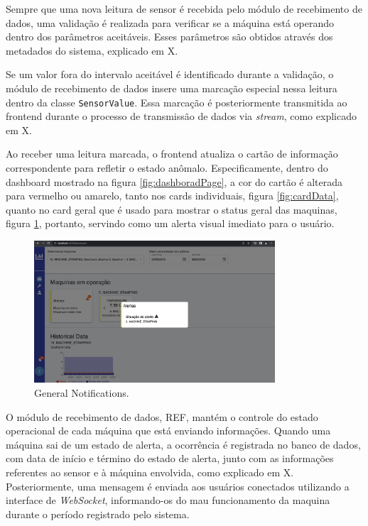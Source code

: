 Sempre que uma nova leitura de sensor é recebida pelo módulo de recebimento de dados, uma validação é realizada para verificar se a máquina está operando dentro dos parâmetros aceitáveis. Esses parâmetros são obtidos através dos metadados do sistema, explicado em X.

Se um valor fora do intervalo aceitável é identificado durante a validação, o módulo de recebimento de dados insere uma marcação especial nessa leitura dentro da classe \texttt{SensorValue}. Essa marcação é posteriormente transmitida ao frontend durante o processo de transmissão de dados via \textit{stream}, como explicado em X. %

Ao receber uma leitura marcada, o frontend atualiza o cartão de informação correspondente para refletir o estado anômalo. Especificamente, dentro do dashboard mostrado na figura \ref{fig:dashboradPage}, a cor do cartão é alterada para vermelho ou amarelo, tanto nos cards individuais, figura \ref{fig:cardData}, quanto no card geral que é usado para mostrar o status geral das maquinas, figura \ref{fig:geralMachineAlert}, portanto, servindo como um alerta visual imediato para o usuário. 

\begin{figure}[htbp]
	\centering
	\includegraphics[width=0.8\textwidth]{images/geralMachineAlert.png}
	\caption{General Notifications.}
	\label{fig:geralMachineAlert}
\end{figure}

O módulo de recebimento de dados, REF, mantém o controle do estado operacional de cada máquina que está enviando informações. Quando uma máquina sai de um estado de alerta, a ocorrência é registrada no banco de dados, com data de início e término do estado de alerta, junto com as informações referentes ao sensor e à máquina envolvida, como explicado em X. Posteriormente, uma mensagem é enviada aos usuários conectados utilizando a interface de \textit{WebSocket}, informando-os do mau funcionamento da maquina durante o período registrado pelo sistema. %

